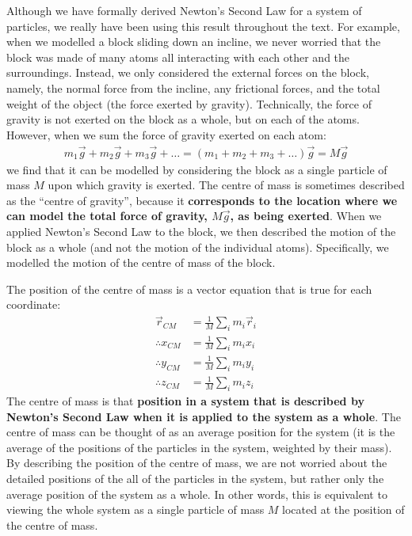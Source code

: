 Although we have formally derived Newton's Second Law for a system of particles, we really have been using this result throughout the text. For example, when we modelled a block sliding down an incline, we never worried that the block was made of many atoms all interacting with each other and the surroundings. Instead, we only considered the external forces on the block, namely, the normal force from the incline, any frictional forces, and the total weight of the object (the force exerted by gravity). Technically, the force of gravity is not exerted on the block as a whole, but on each of the atoms. However, when we sum the force of gravity exerted on each atom:
\begin{align*}
m_1\vec g+ m_2 \vec g + m_3\vec g + \dots = (m_1+m_2+m_3+\dots)\vec g = M\vec g
\end{align*}
we find that it can be modelled by considering the block as a single particle of mass $M$ upon which gravity is exerted. The centre of mass is sometimes described as the ``centre of gravity'', because it \textbf{corresponds to the location where we can model the total force of gravity, $M\vec g$, as being exerted}. When we applied Newton's Second Law to the block, we then described the motion of the block as a whole (and not the motion of the individual atoms). Specifically, we modelled the motion of the centre of mass of the block. 

The position of the centre of mass is a vector equation that is true for each coordinate:
\begin{align}
\vec r_{CM} &=\frac{1}{M}\sum_i m_i\vec r_i\nonumber\\
\therefore x_{CM} &= \frac{1}{M}\sum_i m_i x_i\nonumber\\
\therefore y_{CM} &= \frac{1}{M}\sum_i m_i y_i\nonumber\\
\therefore z_{CM} &= \frac{1}{M}\sum_i m_i z_i
\end{align}
The centre of mass is that \textbf{position in a system that is described by Newton's Second Law when it is applied to the system as a whole}. The centre of mass can be thought of as an average position for the system (it is the average of the positions of the particles in the system, weighted by their mass). By describing the position of the centre of mass, we are not worried about the detailed positions of the all of the particles in the system, but rather only the average position of the system as a whole. In other words, this is equivalent to viewing the whole system as a single particle of mass $M$ located at the position of the centre of mass. 

